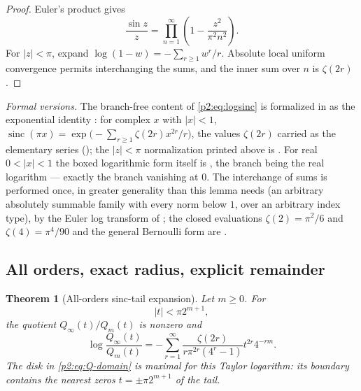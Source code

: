 \documentclass[11pt,oneside]{article}
\numberwithin{equation}{section}
\newtheorem{theorem}{Theorem}[section]
\theoremstyle{definition}
\theoremstyle{remark}
\newcommand{\sinc}{\operatorname{sinc}}
\begin{document}
\begin{proof}
Euler's product gives
\[
 \frac{\sin z}{z}=\prod_{n=1}^{\infty}
 \left(1-\frac{z^2}{\pi^2n^2}\right).
\]
For $|z|<\pi$, expand $\log(1-w)=-\sum_{r\ge1}w^r/r$.  Absolute local uniform
convergence permits interchanging the sums, and the inner sum over $n$ is $\zeta(2r)$.
\end{proof}

\emph{Formal versions.}  The branch-free content of \eqref{p2:eq:logsinc} is formalized in
 as the exponential identity
: for complex $x$ with $|x|<1$,
$\sinc(\pi x)=\exp\bigl(-\sum_{r\ge1}\zeta(2r)x^{2r}/r\bigr)$, the values $\zeta(2r)$ carried
as the elementary series  (); the $|z|<\pi$
normalization printed above is .  For real $0<|x|<1$ the
boxed logarithmic form itself is , the branch being the
real logarithm --- exactly the branch vanishing at $0$.  The interchange of sums is performed
once, in greater generality than this lemma needs (an arbitrary absolutely summable family
with every norm below $1$, over an arbitrary index type), by the Euler log transform
 of ; the closed
evaluations $\zeta(2)=\pi^2/6$ and $\zeta(4)=\pi^4/90$ and the general Bernoulli form are
.

\subsection{All orders, exact radius, explicit remainder}

\begin{theorem}[All-orders sinc-tail expansion]
\label{p2:thm:all-orders-Q}
Let $m\ge0$.  For
\begin{equation}
 |t|<\pi2^{m+1},
 \label{p2:eq:Q-domain}
\end{equation}
the quotient $Q_\infty(t)/Q_m(t)$ is nonzero and
\begin{equation}
 \boxed{
 \log\frac{Q_\infty(t)}{Q_m(t)}
 =-\sum_{r=1}^{\infty}
 \frac{\zeta(2r)}{r\pi^{2r}(4^r-1)}
 t^{2r}4^{-rm}.}
 \label{p2:eq:Q-all-orders}
\end{equation}
The disk in \eqref{p2:eq:Q-domain} is maximal for this Taylor logarithm: its boundary contains
the nearest zeros $t=\pm\pi2^{m+1}$ of the tail.
\newresult
\end{theorem}
\end{document}
